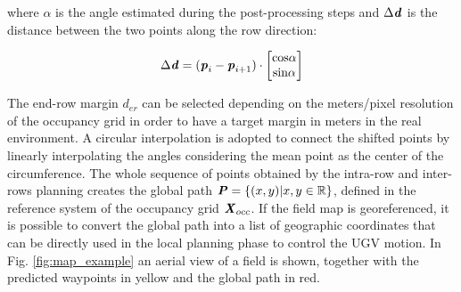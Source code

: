 \documentclass[journal]{IEEEtran}
\begin{document}
where $\alpha$ is the angle estimated during the post-processing steps and $\Delta \textbf{\textit{d}}$ is the distance between the two points along the row direction:

\begin{equation}
    \Delta \textbf{\textit{d}} = (\textbf{\textit{p}}_i - \textbf{\textit{p}}_{i+1}) \cdot \begin{bmatrix} \text{cos}\alpha\\ \text{sin}\alpha\end{bmatrix} 
\end{equation}

The end-row margin $d_{er}$ can be selected depending on the meters/pixel resolution of the occupancy grid in order to have a target margin in meters in the real environment. A circular interpolation is adopted to connect the shifted points by linearly interpolating the angles considering the mean point as the center of the circumference.
The whole sequence of points obtained by the intra-row and inter-rows planning creates the global path $\textbf{\emph{P}} = \{(x,y)| x,y \in \mathbb{R}\}$, defined in the reference system of the occupancy grid $\textbf{\textit{X}}_{occ}$. If the field map is georeferenced, it is possible to convert the global path into a list of geographic coordinates that can be directly used in the local planning phase to control the UGV motion. In Fig. \ref{fig:map_example} an aerial view of a field is shown, together with the predicted waypoints in yellow and the global path in red.
\end{document}
